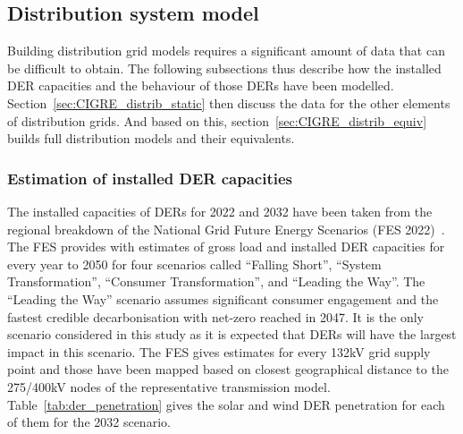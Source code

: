 \subsection{Distribution system model}
\label{sec:CIGRE_distrib}

Building distribution grid models requires a significant amount of data that can be difficult to obtain. The following subsections thus describe how the installed DER capacities and the behaviour of those DERs have been modelled. Section~\ref{sec:CIGRE_distrib_static} then discuss the data for the other elements of distribution grids. And based on this, section~\ref{sec:CIGRE_distrib_equiv} builds full distribution models and their equivalents.

\subsubsection{Estimation of installed DER capacities}
\label{sec:CIGRE_distrib_capacity}

The installed capacities of DERs for 2022 and 2032 have been taken from the regional breakdown of the National Grid Future Energy Scenarios (FES 2022)~\cite{FES_regional}. The FES provides with estimates of gross load and installed DER capacities for every year to 2050 for four scenarios called ``Falling Short'', ``System Transformation'', ``Consumer Transformation'', and ``Leading the Way''. The ``Leading the Way'' scenario assumes significant consumer engagement and the fastest credible decarbonisation with net-zero reached in 2047. It is the only scenario considered in this study as it is expected that DERs will have the largest impact in this scenario. The FES gives estimates for every 132kV grid supply point and those have been mapped based on closest geographical distance to the 275/400kV nodes of the representative transmission model. Table~\ref{tab:der_penetration} gives the solar and wind DER penetration for each of them for the 2032 scenario.

